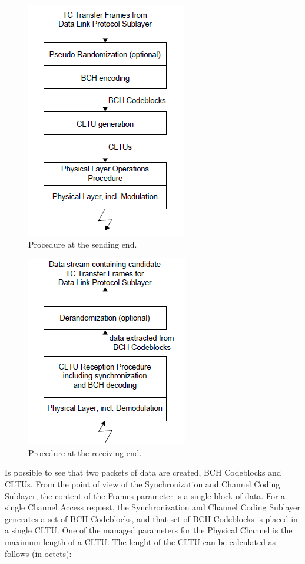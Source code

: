 \begin{figure}[H]
\begin{center}
\includegraphics[scale=1]{Proceduressendingend.PNG}    
\caption{Procedure at the sending end.}
\end{center}
\end{figure}

\begin{figure}[H]
\begin{center}
\includegraphics[scale=1]{proceduresreceivingend.PNG}  
\caption{Procedure at the receiving end.}
\end{center}
\end{figure}

Is possible to see that two packets of data are created, BCH Codeblocks and CLTUs. From the point of view of the Synchronization and Channel Coding Sublayer, the content of the Frames parameter is a single block of data. For a single Channel Access request, the Synchronization and Channel Coding Sublayer generates a set of BCH Codeblocks, and that set of BCH Codeblocks is placed in a single CLTU. One of the managed parameters for the Physical Channel is the maximum length of a CLTU. The lenght of the CLTU can be calculated as follows (in octets):

